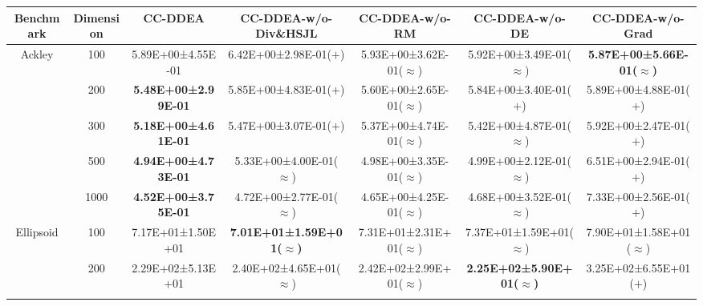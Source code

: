 \begin{tabular}{|cc|c|c|c|c|c|}
\hline
\multicolumn{1}{|c|}{Benchmark}                   & Dimension & CC-DDEA                    & CC-DDEA-w/o-Div\&HSJL                 & CC-DDEA-w/o-RM               & CC-DDEA-w/o-DE                        & CC-DDEA-w/o-Grad                      \\ \hline
\multicolumn{1}{|c|}{\multirow{5}{*}{Ackley}}     & 100       & 5.89E+00±4.55E-01          & 6.42E+00±2.98E-01($+$)                & 5.93E+00±3.62E-01($\approx$) & 5.92E+00±3.49E-01($\approx$)          & \textbf{5.87E+00±5.66E-01($\approx$)} \\ \cline{2-7} 
\multicolumn{1}{|c|}{}                            & 200       & \textbf{5.48E+00±2.99E-01} & 5.85E+00±4.83E-01($+$)                & 5.60E+00±2.65E-01($\approx$) & 5.84E+00±3.40E-01($+$)                & 5.89E+00±4.88E-01($+$)                \\ \cline{2-7} 
\multicolumn{1}{|c|}{}                            & 300       & \textbf{5.18E+00±4.61E-01} & 5.47E+00±3.07E-01($+$)                & 5.37E+00±4.74E-01($\approx$) & 5.42E+00±4.87E-01($\approx$)          & 5.92E+00±2.47E-01($+$)                \\ \cline{2-7} 
\multicolumn{1}{|c|}{}                            & 500       & \textbf{4.94E+00±4.73E-01} & 5.33E+00±4.00E-01($\approx$)          & 4.98E+00±3.35E-01($\approx$) & 4.99E+00±2.12E-01($\approx$)          & 6.51E+00±2.94E-01($+$)                \\ \cline{2-7} 
\multicolumn{1}{|c|}{}                            & 1000      & \textbf{4.52E+00±3.75E-01} & 4.72E+00±2.77E-01($\approx$)          & 4.65E+00±4.25E-01($\approx$) & 4.68E+00±3.52E-01($\approx$)          & 7.33E+00±2.56E-01($+$)                \\ \hline
\multicolumn{1}{|c|}{\multirow{5}{*}{Ellipsoid}}  & 100       & 7.17E+01±1.50E+01          & \textbf{7.01E+01±1.59E+01($\approx$)} & 7.31E+01±2.31E+01($\approx$) & 7.37E+01±1.59E+01($\approx$)          & 7.90E+01±1.58E+01($\approx$)          \\ \cline{2-7} 
\multicolumn{1}{|c|}{}                            & 200       & 2.29E+02±5.13E+01          & 2.40E+02±4.65E+01($\approx$)          & 2.42E+02±2.99E+01($\approx$) & \textbf{2.25E+02±5.90E+01($\approx$)} & 3.25E+02±6.55E+01($+$)                \\ \cline{2-7} 

\end{tabular}
